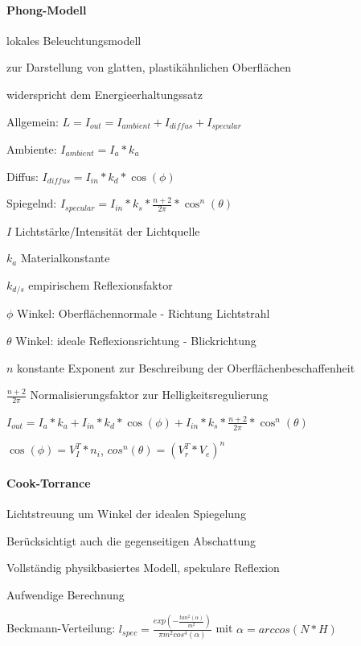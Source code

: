 \documentclass[landscape]{article}
\begin{document}
\begin{multicols}{3}
  \paragraph{Phong-Modell}
  \begin{itemize*}
    \item lokales Beleuchtungsmodell
    \item zur Darstellung von glatten, plastikähnlichen Oberflächen
    \item widerspricht dem Energieerhaltungssatz
    \item Allgemein: $L=I_{out}=I_{ambient}+I_{diffus}+I_{specular}$
    \item Ambiente: $I_{ambient}=I_a * k_a$
    \item Diffus: $I_{diffus}=I_{in}*k_d*\cos(\phi)$
    \item Spiegelnd: $I_{specular}=I_{in}*k_s*\frac{n+2}{2\pi}*\cos^n({\theta})$
    \begin{itemize*}
      \item $I$ Lichtstärke/Intensität der Lichtquelle
      \item $k_a$ Materialkonstante
      \item $k_{d/s}$ empirischem Reflexionsfaktor
      \item $\phi$ Winkel: Oberflächennormale - Richtung Lichtstrahl
      \item $\theta$ Winkel: ideale Reflexionsrichtung - Blickrichtung
      \item $n$ konstante Exponent zur Beschreibung der Oberflächenbeschaffenheit
    \end{itemize*}
    \item $\frac{n+2}{2\pi}$ Normalisierungsfaktor zur Helligkeitsregulierung
    \item $I_{out}=I_a*k_a+I_{in}*k_d*\cos(\phi)+I_{in}*k_s*\frac{n+2}{2\pi}*\cos^n(\theta)$
    \item $\cos(\phi)=V^T_I*n_i$, $cos^n(\theta)=(V^T_r * V_e)^n$
  \end{itemize*}
  
  \paragraph{Cook-Torrance}
  \begin{itemize*}
    \item Lichtstreuung um Winkel der idealen Spiegelung
    \item Berücksichtigt auch die gegenseitigen Abschattung
    \item Vollständig physikbasiertes Modell, spekulare Reflexion
    \item Aufwendige Berechnung
    \item Beckmann-Verteilung: $l_{spec}=\frac{exp(-\frac{tan^2(\alpha)}{m^2})}{\pi m^2 cos^4 (\alpha)}$ mit $\alpha=arccos(N*H)$
  \end{itemize*}
  
\end{multicols}
\end{document}
